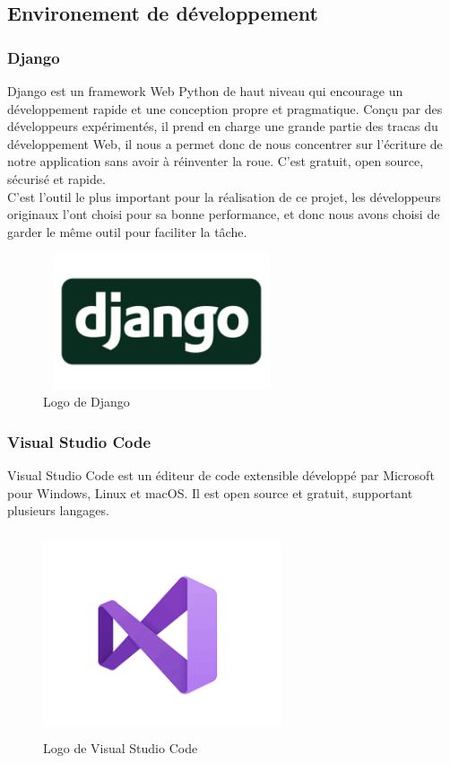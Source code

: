 \newline
\subsection{Environement de développement}
\subsubsection*{Django}
Django est un framework Web Python de haut niveau qui encourage un développement rapide et une conception propre et pragmatique. Conçu par des développeurs expérimentés, il prend en charge une grande partie des tracas du développement Web, il nous a permet  donc de nous concentrer sur l'écriture de notre application sans avoir à réinventer la roue. C'est gratuit, open source, sécurisé et rapide.\\
C'est l'outil le plus important pour la réalisation de ce projet, les développeurs originaux l'ont choisi pour sa bonne performance, et donc nous avons choisi de garder le même outil pour faciliter la tâche.
\begin{figure}[H]
      \centering
        \includegraphics[width=7cm,height=4cm]{img/django-logo.jpg}
        \caption{Logo de Django}
\end{figure}
\newline

\subsubsection*{Visual Studio Code}
Visual Studio Code est un éditeur de code extensible développé par Microsoft pour Windows, Linux et macOS. Il est  open source et gratuit, supportant plusieurs langages.
\begin{figure}[H]
      \centering
        \includegraphics[width=7cm,height=6cm]{img/VS.png}
        \caption{Logo de Visual Studio Code}
\end{figure}
\newline
